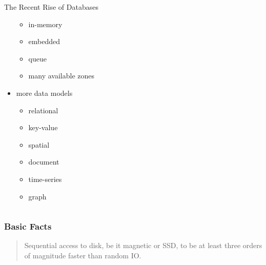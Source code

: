 \documentclass[lualatex]{beamer}
\begin{document}
\begin{frame}
\begin{columns}
\begin{column}{0.45\textwidth}
\begin{exampleblock}{The Recent Rise of Databases}
\begin{itemize}
\begin{itemize}
              \item in-memory
              \item embedded
              \item queue
              \item many available zones
            \end{itemize}
          \item more data models
            \begin{itemize}
              \item relational
              \item key-value
              \item spatial
              \item document
              \item time-series
              \item graph
            \end{itemize}
        \end{itemize}
      \end{exampleblock}
    \end{column}
  \end{columns}
\end{frame}

\begin{frame}
  \frametitle{Basic Facts}
  \begin{quotation}
    Sequential access to disk, be it magnetic or SSD, to be at least three orders of magnitude faster than random IO.
  \end{quotation}
\end{frame}
\end{document}
